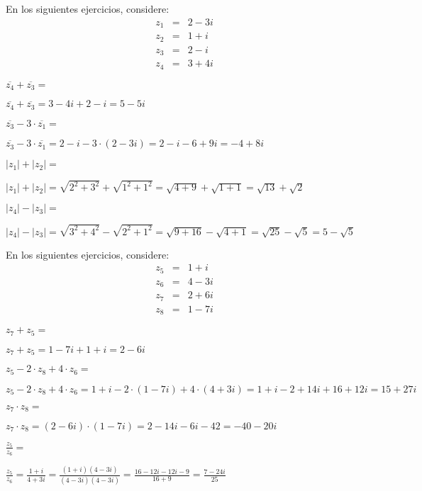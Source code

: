 \documentclass[12pt,addpoints,x11names]{exam}
\begin{document}
\begin{questions}
En los siguientes ejercicios, considere:
\begin{eqnarray*}
  z_1&=&2-3i\\
  z_2&=&1+i\\
  z_3&=&2-i\\
  z_4&=&3+4i
\end{eqnarray*}

 \question[3] $\overline{z_4}+\overline{z_3}=$
   \begin{solutionbox}{1.3in}
     $\overline{z_4}+\overline{z_3}=3-4i+2-i=5-5i$
  \end{solutionbox}
\question[3] $\overline{z_3}-3\cdot\overline{z_1}=$
   \begin{solutionbox}{1.3in}
     $\overline{z_3}-3\cdot\overline{z_1}=2-i-3\cdot(2-3i)=2-i-6+9i=-4+8i$
  \end{solutionbox}
\question[3] $|z_1|+|z_2|=$
   \begin{solutionbox}{1.3in}
     $|z_1|+|z_2|=\sqrt{2^{2}+3^{2}}+\sqrt{1^{2}+1^{2}}=\sqrt{4+9}+\sqrt{1+1}=\sqrt{13}+\sqrt{2}$
  \end{solutionbox}
\question[3] $|z_4|-|z_3|=$
  \begin{solutionbox}{1.3in}
     $|z_4|-|z_3|=\sqrt{3^{2}+4^{2}}-\sqrt{2^{2}+1^{2}}=\sqrt{9+16}-\sqrt{4+1}=\sqrt{25}-\sqrt{5}=5-\sqrt{5}$
  \end{solutionbox}
  \pagebreak

En los siguientes ejercicios, considere:
\begin{eqnarray*}
  z_5&=&1+i\\
  z_6&=&4-3i\\
  z_7&=&2+6i\\
  z_8&=&1-7i
\end{eqnarray*}

 
\question[3] $z_7+z_5=$
  \begin{solutionbox}{1.2in}
     $z_7+z_5=1-7i+1+i=2-6i$
  \end{solutionbox}
\question[3] $z_5-2\cdot z_8+4\cdot z_6=$
  \begin{solutionbox}{1.2in}
     $z_5-2\cdot z_8+4\cdot z_6=1+i-2\cdot(1-7i)+4\cdot(4+3i)=1+i-2+14i+16+12i=15+27i$
  \end{solutionbox}
\question[3] $z_7\cdot z_8=$
  \begin{solutionbox}{1.2in}
     $z_7\cdot z_8=(2-6i)\cdot(1-7i)=2-14i-6i-42=-40-20i$
  \end{solutionbox}
\question[3] $\frac{z_5}{z_6}=$
  \begin{solutionbox}{1.2in}
     $\frac{z_5}{z_6}=\frac{1+i}{4+3i}=\frac{(1+i)(4-3i)}{(4-3i)(4-3i)}=\frac{16-12i-12i-9}{16+9}=\frac{7-24i}{25}$
  \end{solutionbox}













\end{questions}
\end{document}
